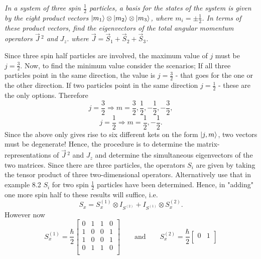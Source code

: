 \begin{example}
	\emph{In a system of three spin $\frac{1}{2}$ particles, a basis for the states of the system is given by the eight product vectors $\ket{m_1}\otimes\ket{m_2}\otimes\ket{m_3}$, where $m_i=\pm\frac{1}{2}$. In terms of these product vectors, find the eigenvectors of the total angular momentum operators $\vec{J}\,^2$ and $J_z$. where $\vec{J}=\vec{S}_1+\vec{S}_2+\vec{S}_3$.}\newline
	
	Since three spin half particles are involved, the maximum value of $j$ must be $j=\frac{3}{2}$. Now, to find the minimum value consider the scenarios; If all three particles point in the same direction, the value is $j=\frac{3}{2}$ - that goes for the one or the other direction. If two particles point in the same direction $j=\frac{1}{2}$ - these are the only options. Therefore
	\begin{equation}
		j=\frac{3}{2} \Rightarrow m=\frac{3}{2},\frac{1}{2},-\frac{1}{2},-\frac{3}{2},
	\end{equation} 
	\begin{equation}
		j=\frac{1}{2} \Rightarrow m=\frac{1}{2},-\frac{1}{2}.
	\end{equation} 
	Since the above only gives rise to six different kets on the form $\ket{j,m}$, two vectors must be degenerate! Hence, the procedure is to determine the matrix-representations of $\vec{J}\,^2$ and $J_z$ and determine the simultaneous eigenvectors of the two matrices. Since there are three particles, the operators $S_i$ are given by taking the tensor product of three two-dimensional operators. Alternatively use that in example 8.2 $S_i$ for two spin $\frac{1}{2}$ particles have been determined. Hence, in "adding" one more spin half to these results will suffice,  i.e.
	\begin{equation}
		S_x=S^{(1)}_x \otimes I_{S^{(2)}} +I_{S^{(1)}}\otimes S^{(2)}_x.
	\end{equation} 
	However now
	\begin{equation}
		S^{(1)}_x=\frac{\hbar}{2}\begin{bmatrix}
			0 & 1 & 1 & 0 \\
			1 & 0 & 0 & 1 \\
			1 & 0 & 0 & 1 \\
			0 & 1 & 1 & 0 \\
		\end{bmatrix} \qquad \mbox{and} \qquad S^{(2)}_x=\frac{\hbar}{2}\begin{bmatrix}
			0 & 1 \\

\end{bmatrix}
\end{equation}
\end{example}
